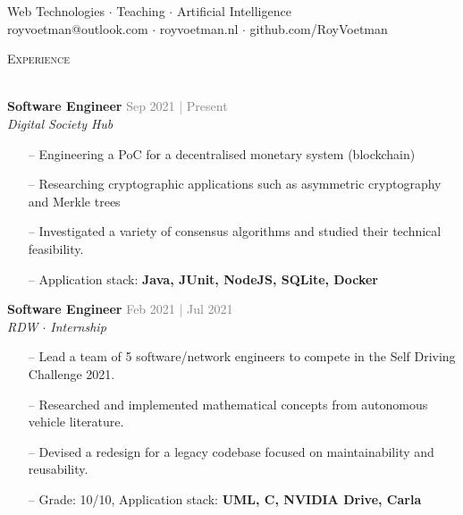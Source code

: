 \documentclass[a4paper]{article}
\newcommand{\lineunder} {
    \vspace*{-8pt} \\
    \hspace*{-18pt} \hrulefill \\
}
\newcommand{\header} [1] {
    {\hspace*{-18pt}\vspace*{6pt} \textsc{#1}}
    \vspace*{-6pt} \lineunder
}
\newcommand{\roundpic}[4][]{
  \tikz\node [circle, minimum width = #2,
    path picture = {
      \node [#1] at (path picture bounding box.center) {
        \texttt{[image: \#4]}};
    }] {};}
\begin{document}
\vspace*{-40pt}

    

\vspace*{-10pt}

\vspace{10mm}

\begin{center}
    \centering
    \raisebox{-0.5\height}{\roundpic{2cm}{2cm}{avatar.jpg}}
    \hspace*{.1in}
    
    \vspace*{10pt}
    {Web Technologies $\cdot$ Teaching $\cdot$ Artificial Intelligence}\\
    \vspace*{3pt}
	royvoetman@outlook.com $\cdot$ royvoetman.nl $\cdot$ github.com/RoyVoetman\\
\end{center}

\vspace{5mm}

\header{Experience}
\vspace{1mm}

\textbf{Software Engineer} \hfill \textcolor{gray}{Sep 2021 | Present}\\
\textit{Digital Society Hub}\\
\vspace{-1mm}
\begin{itemize} \itemsep 1pt
    \item[--] Engineering a PoC for a decentralised monetary system (blockchain)
    \item[--] Researching cryptographic applications such as asymmetric cryptography and Merkle trees
    \item[--] Investigated a variety of consensus algorithms and studied their technical feasibility.  
	\item[--] Application stack: \textbf{Java, JUnit, NodeJS, SQLite, Docker}
\end{itemize}

\textbf{Software Engineer} \hfill \textcolor{gray}{Feb 2021 | Jul 2021}\\
\textit{RDW $\cdot$ Internship}\\
\vspace{-1mm}
\begin{itemize} \itemsep 1pt
    \item[--] Lead a team of 5 software/network engineers to compete in the Self Driving Challenge 2021.
	\item[--] Researched and implemented mathematical concepts from autonomous vehicle literature.
    \item[--] Devised a redesign for a legacy codebase focused on maintainability and reusability.
	\item[--] Grade: 10/10, Application stack: \textbf{UML, C\scalebox{0.7}{++}, NVIDIA Drive, Carla}
\end{itemize}
\end{document}
